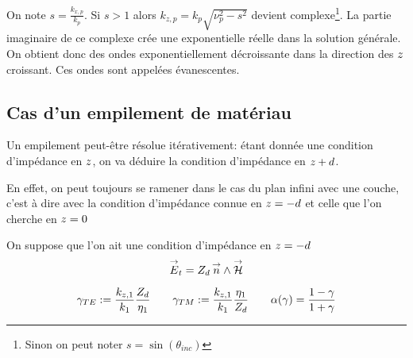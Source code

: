 On note $s=\frac{k_{x,p}}{k_p}$. Si $s>1$ alors $k_{z,p} = k_p\sqrt{\nu_p^2-s^2}$ devient complexe\footnote{Sinon on peut noter $s=\sin(\theta_{inc})$}.
La partie imaginaire de ce complexe crée une exponentielle réelle dans la solution générale. On obtient donc des ondes exponentiellement décroissante dans la direction des ${z}$ croissant. Ces ondes sont appelées évanescentes.

\subsection{Cas d'un empilement de matériau}

Un empilement peut-être résolue itérativement: étant donnée une condition d'impédance en ${z}$, on va déduire la condition d'impédance en ${z}+d$.

En effet, on peut toujours se ramener dans le cas du plan infini avec une couche, c'est à dire avec la condition d'impédance connue en ${z}=-d$ et celle que l'on cherche en ${z}=0$

On suppose que l'on ait une condition d'impédance en ${z}=-d$
\[
{\overset{\rightarrow}{E}}_t=Z_d \, {\overset{\rightarrow}{n}} \wedge  {\overset{\rightarrow}{\mathcal{H}}}
\]


\begin{align*}
\gamma_{TE} := \dfrac{k_{{z},1}}{k_1} \dfrac{Z_d}{\eta_1} \qquad
\gamma_{TM} := \dfrac{k_{{z},1}}{k_1} \dfrac{\eta_1}{Z_d}  \qquad
\alpha(\gamma) = \dfrac{1-\gamma}{1+\gamma}
\end{align*}

